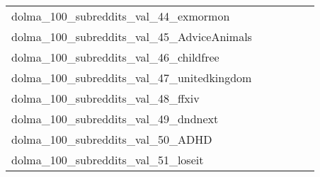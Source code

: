 {\begin{longtable}{m{6cm}m{1.7cm}m{1.7cm}m{1.7cm}m{1.7cm}m{1.7cm}}
	dolma\_100\_subreddits\_val\_44\_exmormon  & \colorbox[HTML]{ffffe5}{\makebox[\mywidth][c]{23.12}} & \colorbox[HTML]{9dd687}{\makebox[\mywidth][c]{21.90}} & \colorbox[HTML]{ffffe5}{\makebox[\mywidth][c]{23.44}} & \colorbox[HTML]{c8e89a}{\makebox[\mywidth][c]{21.99}} & \colorbox[HTML]{77c578}{\makebox[\mywidth][c]{21.84}}\\
	dolma\_100\_subreddits\_val\_45\_AdviceAnimals  & \colorbox[HTML]{ffffe5}{\makebox[\mywidth][c]{22.14}} & \colorbox[HTML]{d5eea1}{\makebox[\mywidth][c]{20.96}} & \colorbox[HTML]{ffffe5}{\makebox[\mywidth][c]{22.14}} & \colorbox[HTML]{ddf1a6}{\makebox[\mywidth][c]{20.98}} & \colorbox[HTML]{77c578}{\makebox[\mywidth][c]{20.79}}\\
	dolma\_100\_subreddits\_val\_46\_childfree  & \colorbox[HTML]{ffffe5}{\makebox[\mywidth][c]{21.87}} & \colorbox[HTML]{c3e698}{\makebox[\mywidth][c]{20.85}} & \colorbox[HTML]{ffffe5}{\makebox[\mywidth][c]{22.13}} & \colorbox[HTML]{d7efa2}{\makebox[\mywidth][c]{20.89}} & \colorbox[HTML]{77c578}{\makebox[\mywidth][c]{20.72}}\\
	dolma\_100\_subreddits\_val\_47\_unitedkingdom  & \colorbox[HTML]{ffffe5}{\makebox[\mywidth][c]{23.27}} & \colorbox[HTML]{c9e99b}{\makebox[\mywidth][c]{22.00}} & \colorbox[HTML]{ffffe5}{\makebox[\mywidth][c]{23.40}} & \colorbox[HTML]{c8e89a}{\makebox[\mywidth][c]{22.00}} & \colorbox[HTML]{77c578}{\makebox[\mywidth][c]{21.85}}\\
	dolma\_100\_subreddits\_val\_48\_ffxiv  & \colorbox[HTML]{ffffe5}{\makebox[\mywidth][c]{32.53}} & \colorbox[HTML]{b3df91}{\makebox[\mywidth][c]{30.79}} & \colorbox[HTML]{ffffe5}{\makebox[\mywidth][c]{33.33}} & \colorbox[HTML]{def2a6}{\makebox[\mywidth][c]{31.01}} & \colorbox[HTML]{77c578}{\makebox[\mywidth][c]{30.62}}\\
	dolma\_100\_subreddits\_val\_49\_dndnext  & \colorbox[HTML]{ffffe5}{\makebox[\mywidth][c]{29.67}} & \colorbox[HTML]{dbf1a4}{\makebox[\mywidth][c]{28.03}} & \colorbox[HTML]{ffffe5}{\makebox[\mywidth][c]{30.53}} & \colorbox[HTML]{f2fab5}{\makebox[\mywidth][c]{28.26}} & \colorbox[HTML]{77c578}{\makebox[\mywidth][c]{27.63}}\\
	dolma\_100\_subreddits\_val\_50\_ADHD  & \colorbox[HTML]{ffffe5}{\makebox[\mywidth][c]{20.75}} & \colorbox[HTML]{9bd587}{\makebox[\mywidth][c]{19.83}} & \colorbox[HTML]{ffffe5}{\makebox[\mywidth][c]{21.14}} & \colorbox[HTML]{d5eea1}{\makebox[\mywidth][c]{19.95}} & \colorbox[HTML]{77c578}{\makebox[\mywidth][c]{19.78}}\\
	dolma\_100\_subreddits\_val\_51\_loseit  & \colorbox[HTML]{ffffe5}{\makebox[\mywidth][c]{19.36}} & \colorbox[HTML]{a9db8c}{\makebox[\mywidth][c]{18.39}} & \colorbox[HTML]{ffffe5}{\makebox[\mywidth][c]{19.49}} & \colorbox[HTML]{e4f4ab}{\makebox[\mywidth][c]{18.52}} & \colorbox[HTML]{77c578}{\makebox[\mywidth][c]{18.33}}\\

\end{longtable}}
